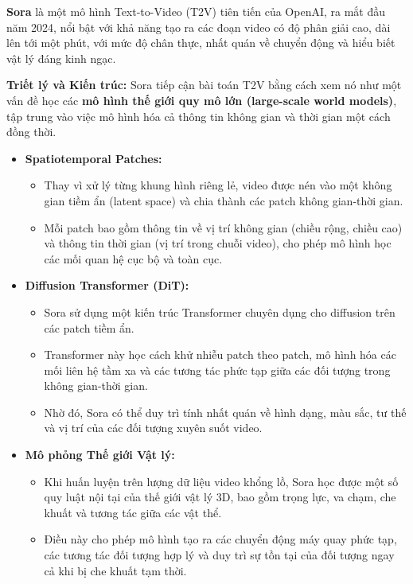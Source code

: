 \textbf{Sora} \cite{OpenAI2024Sora} là một mô hình Text-to-Video (T2V) tiên tiến của OpenAI, ra mắt đầu năm 2024, nổi bật với khả năng tạo ra các đoạn video có độ phân giải cao, dài lên tới một phút, với mức độ chân thực, nhất quán về chuyển động và hiểu biết vật lý đáng kinh ngạc.

\textbf{Triết lý và Kiến trúc:}  
Sora tiếp cận bài toán T2V bằng cách xem nó như một vấn đề học các \textbf{mô hình thế giới quy mô lớn (large-scale world models)}, tập trung vào việc mô hình hóa cả thông tin không gian và thời gian một cách đồng thời.

\begin{itemize}
	\item \textbf{Spatiotemporal Patches:} 
	\begin{itemize}
		\item Thay vì xử lý từng khung hình riêng lẻ, video được nén vào một không gian tiềm ẩn (latent space) và chia thành các patch không gian-thời gian. 
		\item Mỗi patch bao gồm thông tin về vị trí không gian (chiều rộng, chiều cao) và thông tin thời gian (vị trí trong chuỗi video), cho phép mô hình học các mối quan hệ cục bộ và toàn cục.
	\end{itemize}
	
	\item \textbf{Diffusion Transformer (DiT):}
	\begin{itemize}
		\item Sora sử dụng một kiến trúc Transformer chuyên dụng cho diffusion trên các patch tiềm ẩn.
		\item Transformer này học cách khử nhiễu patch theo patch, mô hình hóa các mối liên hệ tầm xa và các tương tác phức tạp giữa các đối tượng trong không gian-thời gian.
		\item Nhờ đó, Sora có thể duy trì tính nhất quán về hình dạng, màu sắc, tư thế và vị trí của các đối tượng xuyên suốt video.
	\end{itemize}
	
	\item \textbf{Mô phỏng Thế giới Vật lý:}
	\begin{itemize}
		\item Khi huấn luyện trên lượng dữ liệu video khổng lồ, Sora học được một số quy luật nội tại của thế giới vật lý 3D, bao gồm trọng lực, va chạm, che khuất và tương tác giữa các vật thể.
		\item Điều này cho phép mô hình tạo ra các chuyển động máy quay phức tạp, các tương tác đối tượng hợp lý và duy trì sự tồn tại của đối tượng ngay cả khi bị che khuất tạm thời.
	\end{itemize}
\end{itemize}

